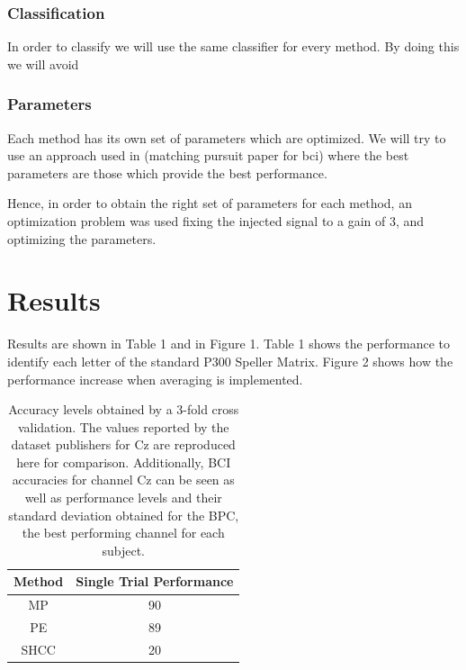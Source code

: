 \documentclass[sensors,article,submit,moreauthors,pdftex,10pt,a4paper]{mdpi}
\begin{document}
\subsubsection{Classification}

In order to classify we will use the same classifier for every method.  By doing this we will avoid 

\subsubsection{Parameters}

Each method has its own set of parameters which are optimized.  We will try to use an approach used in (matching pursuit paper for bci) where the best parameters are those which provide the best performance.

Hence, in order to obtain the right set of parameters for each method, an optimization problem was used fixing the injected signal to a gain of 3, and optimizing the parameters.

\section{Results}
\label{section:results}

Results are shown in Table 1 and in Figure 1.  Table 1 shows the performance to identify each letter of the standard P300 Speller Matrix.   Figure 2 shows how the performance increase when averaging is implemented.


\begin{table}[H]
\caption{Accuracy levels obtained by a 3-fold cross validation. The values reported by the dataset publishers for Cz are reproduced here for comparison. Additionally, BCI accuracies for channel Cz can be seen as well as performance levels and their standard deviation obtained for the BPC, the best performing channel for each subject.}
\centering
\begin{tabular}{cc}
\toprule
\textbf{Method}	& \textbf{Single Trial Performance}	\\
\midrule
MP & 90 \\
PE & 89 \\
SHCC & 20 \\
\bottomrule
\end{tabular}
\label{tab:results}
\end{table}
\end{document}
